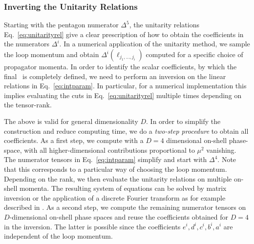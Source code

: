 \subsubsection{Inverting the Unitarity Relations}
\label{sec:invunirel}
Starting with the pentagon numerator $\Delta^5$, the unitarity
relations Eq.~\eqref{eq:unitarityrel} give a clear prescription of how to
obtain the coefficients in the numerators $\Delta^i$. In a numerical application of the unitarity method, we sample the loop momentum and obtain $\Delta^i(\ell_{j_1,\ldots,j_i})$ computed
for a specific choice of propagator momenta. In order to identify the scalar
coefficients, by
which the final \ola~is completely defined, we need to perform an inversion
on the linear relations in Eq.~\eqref{eq:intparam}. In particular, for a
numerical implementation this
implies evaluating the cuts in Eq.~\eqref{eq:unitarityrel} multiple
times depending on the tensor-rank. 


The above is valid for general dimensionality $D$. In order to
simplify the construction and reduce computing time, we do a
\textit{two-step procedure} \cite{Giele:2008ve} to obtain all
coefficients. As a first step, we compute with a $D=4$ dimensional
on-shell phase-space, with all higher-dimensional contributions proportional to $\mu^2$ vanishing. The
numerator tensors in Eq.~\eqref{eq:intparam} simplify and start with
$\Delta^4$. Note that this corresponds to a particular way of choosing
the loop momentum. Depending on the rank, we then evaluate the
unitarity relations on multiple on-shell momenta. The resulting system of equations
can be solved by matrix inversion or the application of a discrete
Fourier transform as for example described in \cite{BlackHatI}. As a
second step, we compute the remaining numerator tensors on $D$-dimensional on-shell
phase spaces and reuse the coefficients obtained for $D=4$ in the
inversion. The latter is possible since the coefficients $e^i,d^i,c^i,b^i,a^i$ are independent of the loop
momentum.

